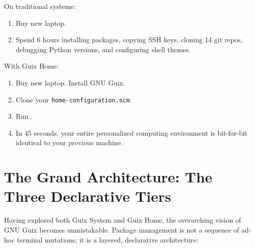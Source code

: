 \begin{tearsbox}
On traditional systems:
\begin{enumerate}
  \item Buy new laptop.
  \item Spend 6 hours installing packages, copying SSH keys, cloning 14 git repos, debugging Python versions, and configuring shell themes.
\end{enumerate}
With Guix Home:
\begin{enumerate}
  \item Buy new laptop. Install GNU Guix.
  \item Clone your \texttt{home-configuration.scm}.
  \item Run .
  \item In 45 seconds, your entire personalized computing environment is bit-for-bit identical to your previous machine.
\end{enumerate}
\end{tearsbox}

\section{The Grand Architecture: The Three Declarative Tiers}

Having explored both Guix System and Guix Home, the overarching vision of GNU Guix becomes unmistakable. Package management is not a sequence of ad-hoc terminal mutations; it is a layered, declarative architecture:

